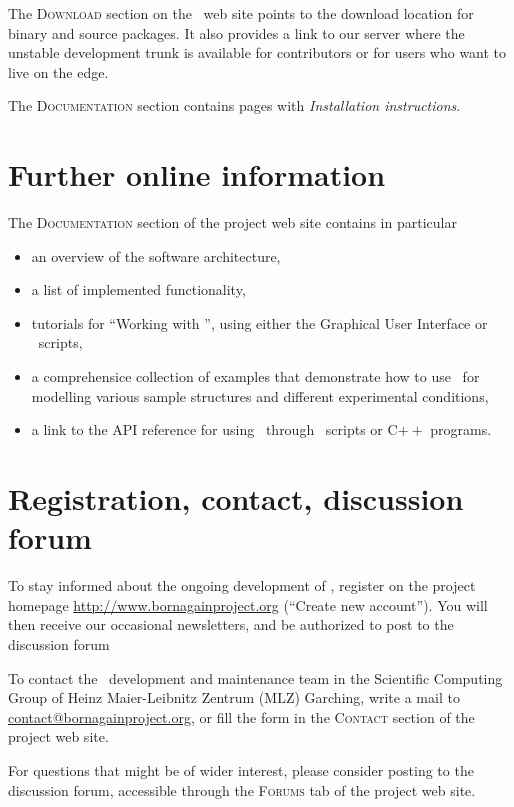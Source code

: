 The \textsc{Download} section on the \BornAgain\ web site
points to the download location for
binary and source packages.
It also provides a link to our  server
where the unstable development trunk is available
for contributors or for users who want to live on the edge.

The \textsc{Documentation} section contains
pages with \textit{Installation instructions}.


\section{Further online information}

The \textsc{Documentation} section of the project web site
contains in particular
\begin{itemize}
\item an overview of the software architecture,
\item a list of implemented functionality,
\item tutorials for ``Working with \BornAgain'',
      using either the Graphical User Interface or
      \Python\ scripts,
\item a comprehensice collection of examples that demonstrate
   how to use \BornAgain\ for modelling various sample structures
    and different experimental conditions,
\item a link to the API reference for using \BornAgain\ through
   \Python\ scripts or C$++$ programs.
\end{itemize}


\section{Registration, contact, discussion forum}

To stay informed about the ongoing development of \BornAgain,
register on the project homepage \url{http://www.bornagainproject.org}
(``Create new account'').
You will then receive our occasional newsletters,
and be authorized to post to the discussion forum

To contact the \BornAgain\ development and maintenance team
in the Scientific Computing Group
of Heinz Maier-Leibnitz Zentrum (MLZ) Garching,
write a mail to \url{contact@bornagainproject.org},
or fill the form in the \textsc{Contact} section of the
project web site.

For questions that might be of wider interest,
please consider posting to the discussion forum,
accessible through the \textsc{Forums} tab of the project web site.
